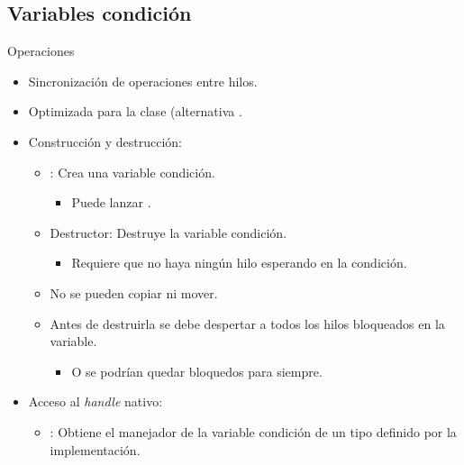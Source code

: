 \subsection{Variables condición}

\begin{frame}{Operaciones}
\begin{itemize}
  \item Sincronización de operaciones entre hilos.
  \item Optimizada para la clase  (alternativa .
  \item Construcción y destrucción:
    \begin{itemize}
      \item {}: Crea una variable condición.
        \begin{itemize}
          \item Puede lanzar .
        \end{itemize}
      \item Destructor: Destruye la variable condición.
        \begin{itemize}
          \item Requiere que no haya ningún hilo esperando en la condición.
        \end{itemize}
      \item No se pueden copiar ni mover.
      \item Antes de destruirla se debe despertar a todos los hilos bloqueados en la variable.
        \begin{itemize}
          \item O se podrían quedar bloquedos para siempre.
        \end{itemize}
    \end{itemize}
  \item Acceso al \emph{handle} nativo:
    \begin{itemize}
      \item {}: Obtiene el manejador de la variable condición
            de un tipo  definido por la implementación.
    \end{itemize}
\end{itemize}
\end{frame}

